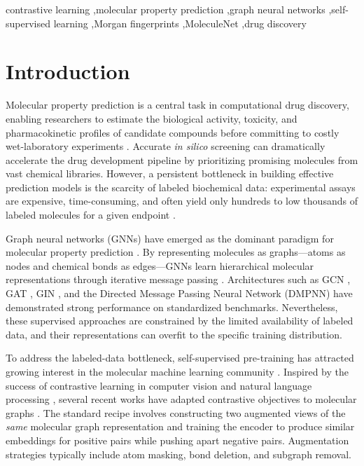 \documentclass[a4paper,fleqn]{cas-sc}
\begin{document}
\begin{keywords}
contrastive learning \sep molecular property prediction \sep graph neural networks \sep self-supervised learning \sep Morgan fingerprints \sep MoleculeNet \sep drug discovery
\end{keywords}

\maketitle

\section{Introduction}\label{sec:intro}

Molecular property prediction is a central task in computational drug discovery, enabling researchers to estimate the biological activity, toxicity, and pharmacokinetic profiles of candidate compounds before committing to costly wet-laboratory experiments \citep{wu2018moleculenet}. Accurate \emph{in silico} screening can dramatically accelerate the drug development pipeline by prioritizing promising molecules from vast chemical libraries. However, a persistent bottleneck in building effective prediction models is the scarcity of labeled biochemical data: experimental assays are expensive, time-consuming, and often yield only hundreds to low thousands of labeled molecules for a given endpoint \citep{yang2019analyzing}.

Graph neural networks (GNNs) have emerged as the dominant paradigm for molecular property prediction \citep{wu2021comprehensive, zhang2020graph}. By representing molecules as graphs---atoms as nodes and chemical bonds as edges---GNNs learn hierarchical molecular representations through iterative message passing \citep{gilmer2017neural}. Architectures such as GCN \citep{kipf2017semi}, GAT \citep{velickovic2018graph}, GIN \citep{xu2018powerful}, and the Directed Message Passing Neural Network (DMPNN) \citep{yang2019analyzing} have demonstrated strong performance on standardized benchmarks. Nevertheless, these supervised approaches are constrained by the limited availability of labeled data, and their representations can overfit to the specific training distribution.

To address the labeled-data bottleneck, self-supervised pre-training has attracted growing interest in the molecular machine learning community \citep{hu2020strategies, rong2020self}. Inspired by the success of contrastive learning in computer vision \citep{chen2020simple, he2020momentum} and natural language processing \citep{gao2021simcse}, several recent works have adapted contrastive objectives to molecular graphs \citep{wang2022molclr, you2020graph}. The standard recipe involves constructing two augmented views of the \emph{same} molecular graph representation and training the encoder to produce similar embeddings for positive pairs while pushing apart negative pairs. Augmentation strategies typically include atom masking, bond deletion, and subgraph removal.
\end{document}
